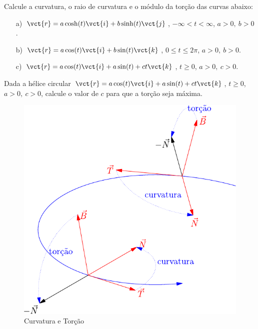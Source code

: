 \begin{exer} Calcule a curvatura, o raio de curvatura e o módulo da torção das curvas abaixo:
\begin{itemize}
\item[a)] $\vct{r}=a\cosh(t)\vct{i}+b\sinh(t)\vct{j}$, $-\infty<t<\infty$, $a>0,\ b>0$.
\item[b)] $\vct{r}=a\cos(t)\vct{i}+b\sin(t)\vct{k}$, $0\leq t\leq 2\pi$, $a>0,\ b>0$.
\item[c)] $\vct{r}=a\cos(t)\vct{i}+a\sin(t)+ct\vct{k}$, $t\geq 0$, $a>0,\ c>0$.

\end{itemize}
\end{exer}
 
 \begin{exer}{\label{prob_torcao}} Dada a hélice circular $\vct{r}=a\cos(t)\vct{i}+a\sin(t)+ct\vct{k}$, $t\geq 0$, $a>0,\ c>0$, calcule o valor de $c$ para que a torção seja máxima.
 \end{exer}


 
 \begin{figure}
\begin{center}
    \includegraphics{./cap_curvas/figs/curvatura_torcao}
 \caption{Curvatura e Torção}\label{Curvatura_torcao_1}
  \end{center}
\end{figure}

